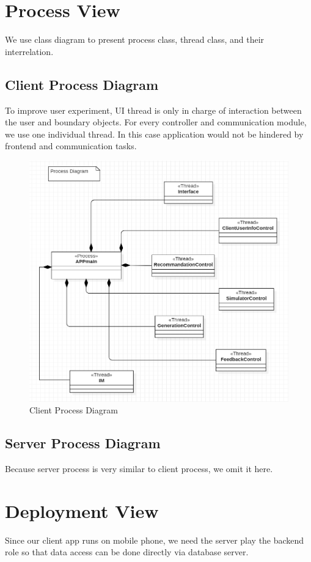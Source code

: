\documentclass[10pt]{article}
\begin{document}
\section{Process View}
We use class diagram to present process class, thread class, and their interrelation.

\subsection{Client Process Diagram}
To improve user experiment, UI thread is only in charge of interaction between the user and boundary objects. For every controller and communication module, we use one individual thread. In this case application would not be hindered by frontend and communication tasks.

\begin{figure}[H]
    \centering
    
    \includegraphics[width=14cm]{process.png}
    \caption{Client Process Diagram}
    \label{Client Process Diagram}
\end{figure}

\subsection{Server Process Diagram}
Because server process is very similar to client process, we omit it here.

\section{Deployment View}
Since our client app runs on mobile phone, we need the server play the backend role so that data access can be done directly via database server.
\end{document}

